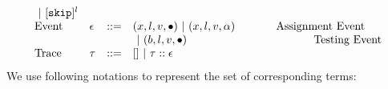 \[\begin{array}{llll}
~|~ [\eskip]^l\\ 
\mbox{Event} 
& \event & ::= & 
    ({x}, l, v, \bullet) ~|~ ({x}, l, v, \qval)  ~~~~~~~~~~~ \mbox{Assignment Event} \\
&&& ~|~(\bexpr, l, v, \bullet)   ~~~~~~~~~~~~~~~~~~~~~~~~~~~~~~~~~~ \mbox{Testing Event}
\\
%
%
\mbox{Trace} & \trace
& ::= & [] ~|~ \trace :: \event\\
\end{array}
\]
We use following notations to represent the set of corresponding terms:
